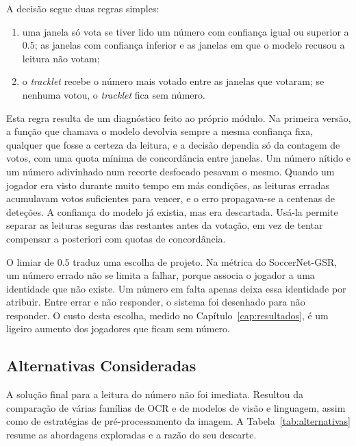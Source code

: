 A decisão segue duas regras simples:
\begin{enumerate}
    \item uma janela só vota se tiver lido um número com confiança igual ou superior a $0.5$; as janelas com confiança inferior e as janelas em que o modelo recusou a leitura não votam;
    \item o \emph{tracklet} recebe o número mais votado entre as janelas que votaram; se nenhuma votou, o \emph{tracklet} fica sem número.
\end{enumerate}

Esta regra resulta de um diagnóstico feito ao próprio módulo. Na primeira versão, a função que chamava o modelo devolvia sempre a mesma confiança fixa, qualquer que fosse a certeza da leitura, e a decisão dependia só da contagem de votos, com uma quota mínima de concordância entre janelas. Um número nítido e um número adivinhado num recorte desfocado pesavam o mesmo. Quando um jogador era visto durante muito tempo em más condições, as leituras erradas acumulavam votos suficientes para vencer, e o erro propagava-se a centenas de deteções. A confiança do modelo já existia, mas era descartada. Usá-la permite separar as leituras seguras das restantes antes da votação, em vez de tentar compensar a posteriori com quotas de concordância.

O limiar de $0.5$ traduz uma escolha de projeto. Na métrica do SoccerNet-GSR, um número errado não se limita a falhar, porque associa o jogador a uma identidade que não existe. Um número em falta apenas deixa essa identidade por atribuir. Entre errar e não responder, o sistema foi desenhado para não responder. O custo desta escolha, medido no Capítulo~\ref{cap:resultados}, é um ligeiro aumento dos jogadores que ficam sem número.

\subsection{Alternativas Consideradas}

A solução final para a leitura do número não foi imediata. Resultou da comparação de várias famílias de OCR e de modelos de visão e linguagem, assim como de estratégias de pré-processamento da imagem. A Tabela~\ref{tab:alternativas} resume as abordagens exploradas e a razão do seu descarte.

